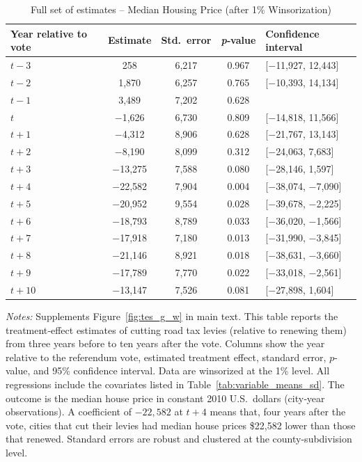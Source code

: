 \begin{table}[htbp]
    \centering
    \caption{Full set of estimates – Median Housing Price (after 1\% Winsorization)}
    \label{tab:median_sale_amount_winsorized}
    \begin{threeparttable}
    \begin{minipage}{\linewidth}
    \centering
    \begin{tabular}{p{3cm}cccl}
        \hline
        \textbf{Year relative to vote} & \textbf{Estimate} & \textbf{Std.~error} & \textbf{\textit{p}‐value} & \textbf{Confidence interval} \\
        \hline
        $t - 3$  & 258    & 6,217  & 0.967 & [$-$11,927, 12,443] \\
        $t - 2$  & 1,870  & 6,257  & 0.765 & [$-$10,393, 14,134] \\
        $t - 1$  & 3,489  & 7,202  & 0.628 & \\
        $t$      & $-$1,626 & 6,730  & 0.809 & [$-$14,818, 11,566] \\
        $t + 1$  & $-$4,312 & 8,906  & 0.628 & [$-$21,767, 13,143] \\
        $t + 2$  & $-$8,190 & 8,099  & 0.312 & [$-$24,063, 7,683] \\
        $t + 3$  & $-$13,275 & 7,588  & 0.080 & [$-$28,146, 1,597] \\
        $t + 4$  & $-$22,582 & 7,904  & 0.004 & [$-$38,074, $-$7,090] \\
        $t + 5$  & $-$20,952 & 9,554  & 0.028 & [$-$39,678, $-$2,225] \\
        $t + 6$  & $-$18,793 & 8,789  & 0.033 & [$-$36,020, $-$1,566] \\
        $t + 7$  & $-$17,918 & 7,180  & 0.013 & [$-$31,990, $-$3,845] \\
        $t + 8$  & $-$21,146 & 8,921  & 0.018 & [$-$38,631, $-$3,660] \\
        $t + 9$  & $-$17,789 & 7,770  & 0.022 & [$-$33,018, $-$2,561] \\
        $t + 10$ & $-$13,147 & 7,526  & 0.081 & [$-$27,898, 1,604] \\
        \hline
    \end{tabular}
    \vspace{0.5em}
    \begin{tablenotes}[flushleft]
        \small
        \item \textit{Notes:} Supplements Figure~\ref{fig:tes_g_w} in main text. This table reports the treatment‐effect estimates of cutting road tax levies (relative to renewing them) from three years before to ten years after the vote. Columns show the year relative to the referendum vote, estimated treatment effect, standard error, \(p\)-value, and 95\% confidence interval. Data are winsorized at the 1\% level. All regressions include the covariates listed in Table~\ref{tab:variable_means_sd}. The outcome is the median house price in constant 2010 U.S.~dollars (city‐year observations). A coefficient of $-22{,}582$ at $t+4$ means that, four years after the vote, cities that cut their levies had median house prices \$22,582 lower than those that renewed. Standard errors are robust and clustered at the county-subdivision level.

\end{tablenotes}
\end{minipage}
\end{threeparttable}
\end{table}
